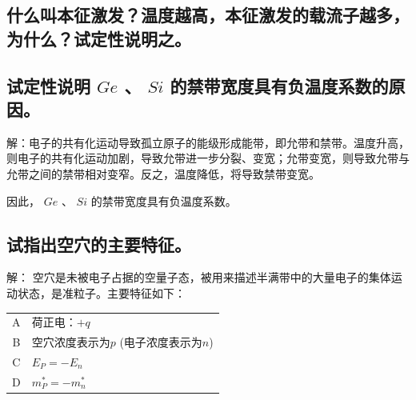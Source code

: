 \documentclass[UTF8]{ctexart}   %
\newcommand{\stxs}{\CJKfamily{SimSun}\fontsize{12pt}{18pt}\selectfont}
\begin{document}
\subsection{什么叫本征激发？温度越高，本征激发的载流子越多，为什么？试定性说明之。}

\stxs{解：在一定温度下，价带电子获得足够的能量（$ \geq Eg $）被激发到导带成为导电电子的过程就是本征激发。其结果是在半导体中出现成对的电子-空穴对。
如果温度升高，则禁带宽度变窄，跃迁所需的能量变小，将会有更多的电子被激发到导带中。}

\subsection{试定性说明 $ Ge $ 、 $ Si $ 的禁带宽度具有负温度系数的原因。}

解：电子的共有化运动导致孤立原子的能级形成能带，即允带和禁带。温度升高，则电子的共有化运动加剧，导致允带进一步分裂、变宽；允带变宽，则导致允带与允带之间的禁带相对变窄。反之，温度降低，将导致禁带变宽。

因此， $ Ge $ 、 $ Si $ 的禁带宽度具有负温度系数。

\subsection{试指出空穴的主要特征。}

解：  空穴是未被电子占据的空量子态，被用来描述半满带中的大量电子的集体运动状态，是准粒子。主要特征如下：

\begin{table}[h]

    \begin{tabular}{ c l }

        A & 荷正电：$ +q $\\
        B & 空穴浓度表示为$ p $ (电子浓度表示为$ n $)\\
        C & $ E_{P} = - E_{n} $\\
        D & $ m_{P}^{*} = - m_{n}^{*} $\\

    \end{tabular}

\end{table}

\end{document}
